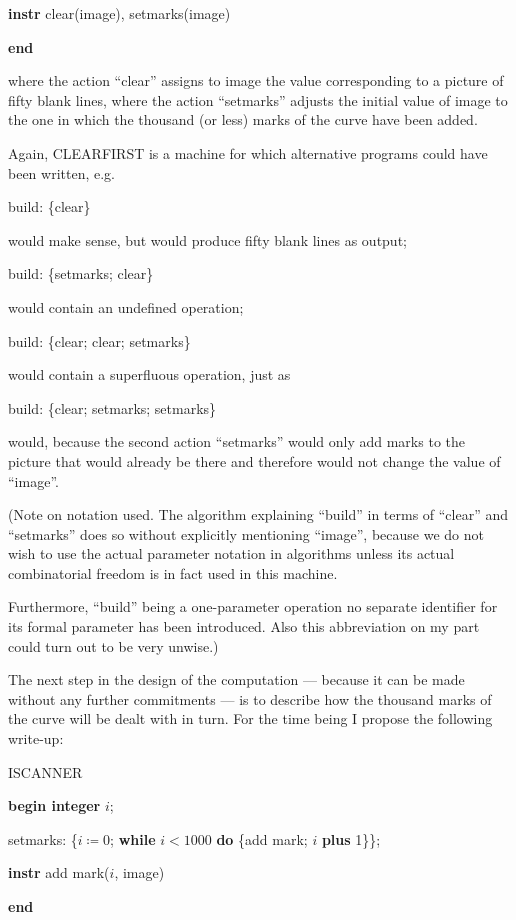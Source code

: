 \quad \textbf{instr} clear(image), setmarks(image)

\textbf{end}

\noindent
where the action ``clear'' assigns to image the value corresponding to a picture of fifty blank lines, where the action ``setmarks'' adjusts the initial value of image to the one in which the thousand (or less) marks of the curve have been added.

Again, CLEARFIRST is a machine for which alternative programs could have been written, e.g.

build: \{clear\}

\noindent
would make sense, but would produce fifty blank lines as output;

build: \{setmarks; clear\}

\noindent
would contain an undefined operation;

build: \{clear; clear; setmarks\}

\noindent
would contain a superfluous operation, just as

build: \{clear; setmarks; setmarks\}

\noindent
would, because the second action ``setmarks'' would only add marks to the picture that would already be there and therefore would not change the value of ``image''.

(Note on notation used. The algorithm explaining ``build'' in terms of ``clear'' and ``setmarks'' does so without explicitly mentioning ``image'', because we do not wish to use the actual parameter notation in algorithms unless its actual combinatorial freedom is in fact used in this machine.

Furthermore, ``build'' being a one-parameter operation no separate identifier for its formal parameter has been introduced. Also this abbreviation on my part could turn out to be very unwise.)

The next step in the design of the computation --- because it can be made without any further commitments --- is to describe how the thousand marks of the curve will be dealt with in turn. For the time being I propose the following write-up:

ISCANNER

\textbf{begin integer} $i$;

\quad setmarks: \{$i \coloneq 0$; \textbf{while} $i < 1000$ \textbf{do} \{add mark; $i$ \textbf{plus} 1\}\};

\quad \textbf{instr} add mark($i$, image)

\textbf{end}

